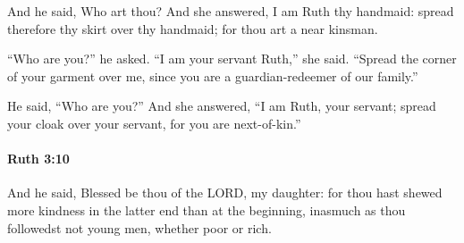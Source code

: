 			\begin{versebox}
					\item[BHS] 
					\item[LXX] 
					\item[ASV] And he said, Who art thou? And she answered, I am Ruth thy handmaid: spread therefore thy skirt over thy handmaid; for thou art a near kinsman.
					\item[NIV] “Who are you?” he asked. “I am your servant Ruth,” she said. “Spread the corner of your garment over me, since you are a guardian-redeemer of our family.”
					\item[NRSV] He said, “Who are you?” And she answered, “I am Ruth, your servant; spread your cloak over your servant, for you are next-of-kin.”
			\end{versebox}

		\paragraph{Ruth 3:10} %
			\label{RUTH-3-10}

			And he said, Blessed be thou of the LORD, my daughter: for thou hast shewed more kindness in the latter end than at the beginning, inasmuch as thou followedst not young men, whether poor or rich.

